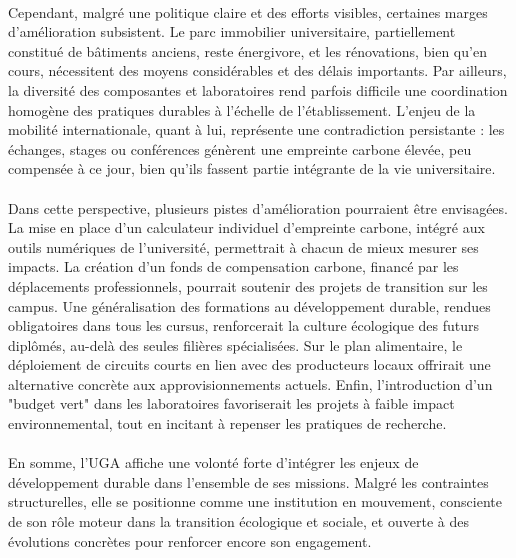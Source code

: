 \documentclass[12pt]{article}
\begin{document}
\\
Cependant, malgré une politique claire et des efforts visibles, certaines marges d’amélioration subsistent. Le parc immobilier universitaire, partiellement constitué de bâtiments anciens, reste énergivore, et les rénovations, bien qu’en cours, nécessitent des moyens considérables et des délais importants. Par ailleurs, la diversité des composantes et laboratoires rend parfois difficile une coordination homogène des pratiques durables à l’échelle de l’établissement. L’enjeu de la mobilité internationale, quant à lui, représente une contradiction persistante : les échanges, stages ou conférences génèrent une empreinte carbone élevée, peu compensée à ce jour, bien qu’ils fassent partie intégrante de la vie universitaire.\\
\\
Dans cette perspective, plusieurs pistes d’amélioration pourraient être envisagées. La mise en place d’un calculateur individuel d’empreinte carbone, intégré aux outils numériques de l’université, permettrait à chacun de mieux mesurer ses impacts. La création d’un fonds de compensation carbone, financé par les déplacements professionnels, pourrait soutenir des projets de transition sur les campus. Une généralisation des formations au développement durable, rendues obligatoires dans tous les cursus, renforcerait la culture écologique des futurs diplômés, au-delà des seules filières spécialisées. Sur le plan alimentaire, le déploiement de circuits courts en lien avec des producteurs locaux offrirait une alternative concrète aux approvisionnements actuels. Enfin, l’introduction d’un "budget vert" dans les laboratoires favoriserait les projets à faible impact environnemental, tout en incitant à repenser les pratiques de recherche.\\
\\
En somme, l’UGA affiche une volonté forte d’intégrer les enjeux de développement durable dans l’ensemble de ses missions. Malgré les contraintes structurelles, elle se positionne comme une institution en mouvement, consciente de son rôle moteur dans la transition écologique et sociale, et ouverte à des évolutions concrètes pour renforcer encore son engagement.
\end{document}
